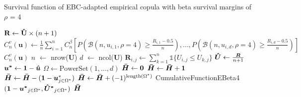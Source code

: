 \documentclass[12pt]{report}
\newcommand{\1}{\mathbf{1}}
\begin{document}
\begin{flushleft}
\begin{algorithm}[H]
\caption{Survival function of EBC-adapted empirical copula with beta survival margins of $\rho$ = 4}
\begin{algorithmic}
 
    \State $\textbf{R} \gets \mathbf{\Hat{U}} \times (n + 1)$
    \State $C^{v}_{n}(\textbf{u}) \gets \frac{1}{n}\sum\limits_{i = 1}^{n} C_{n}^{\beta} \left[P\left(\mathcal{B}(n, u_{i,1}, \rho = 4) \ge \frac{R_{i,1} - 0.5}{n}\right), \dots, P\left(\mathcal{B}(n, u_{i,d}, \rho = 4) \ge \frac{R_{i,d} - 0.5}{n}\right)\right]$
    \State \Return $C^{v}_{n}(\textbf{u})$
\EndProcedure
{}
    \State $n$ $\gets$ nrow($\boldsymbol{U}$)
    \State $d$ $\gets$ ncol($\boldsymbol{U}$)
            \State $\boldsymbol{R}_{i,j} \gets \sum\limits_{k = 1}^{n} \mathds{1} \{ U_{i,j} \le U_{k,j} \}$
        \EndFor
    \EndFor
    \State $\boldsymbol{\Hat{U}} \gets \frac{\boldsymbol{R}}{n + 1}$ 
    \State $\boldsymbol{u^{*}} \gets \boldsymbol{1} - \boldsymbol{\Hat{u}}$ 
    \State $\Omega \gets \mathrm{PowerSet}(1, \dots, d)$ 
    \State $\boldsymbol{\Bar{H}} \gets \boldsymbol{0}$ 
            \State $\boldsymbol{\Bar{H}} \gets \boldsymbol{\Bar{H}} + \boldsymbol{1}$
            \State $\boldsymbol{\Bar{H}} \gets \boldsymbol{\Bar{H}} - (\boldsymbol{1} - \boldsymbol{u}^{*}_{j \in \Omega^{*}})$ 
        \Else
            \State $\boldsymbol{\Bar{H}} \gets \boldsymbol{\Bar{H}} + (-1)^{\mathrm{length}(\Omega^{*})}$ CumulativeFunctionEBeta4$(\boldsymbol{1} - \boldsymbol{u^{*}}_{j \in \Omega^{*}}, \boldsymbol{\Hat{U}^{*}}_{j \in \Omega^{*}}) $
        \EndIf
    \EndFor
    \State \Return $\boldsymbol{\Bar{H}}$
\EndProcedure
\end{algorithmic}
\end{algorithm}


\end{flushleft}
\end{document}
